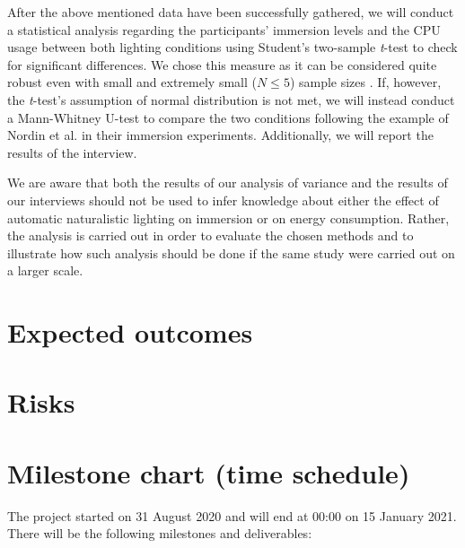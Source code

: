 \documentclass[12pt,twoside,english]{article}
\begin{document}
After the above mentioned data have been successfully gathered, we will conduct a statistical analysis regarding the participants' immersion levels and the CPU usage between both lighting conditions using Student's two-sample \textit{t}-test to check for significant differences.
We chose this measure as it can be considered quite robust even with small and extremely small ($ N \leq 5 $) sample sizes \cite{de_winter_using_2013}.
If, however, the \textit{t}-test's assumption of normal distribution is not met, we will instead conduct a Mann-Whitney U-test to compare the two conditions following the example of Nordin et al. \cite{nordin_attention_2013} in their immersion experiments.
Additionally, we will report the results of the interview.

We are aware that both the results of our analysis of variance and the results of our interviews should not be used to infer knowledge about either the effect of automatic naturalistic lighting on immersion or on energy consumption.
Rather, the analysis is carried out in order to evaluate the chosen methods and to illustrate how such analysis should be done if the same study were carried out on a larger scale.


\section{Expected outcomes}
\label{sect:expected_outcomes}


\section{Risks}
\label{sect:risks}




\section{Milestone chart (time schedule)}
\label{sect:milestones}

The project started on 31 August 2020 and will end at 00:00 on 15 January 2021. There will be the following milestones and deliverables:
\end{document}
